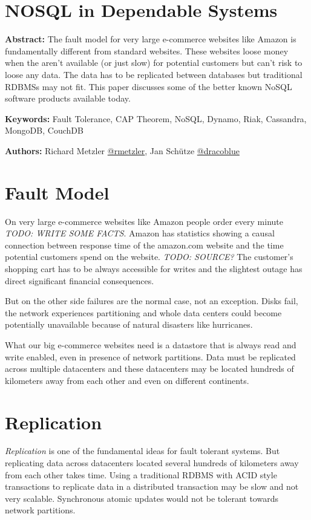 \section{NOSQL in Dependable Systems}

\textbf{Abstract:} The fault model for very large e-commerce
websites like Amazon is fundamentally different from standard
websites. These websites loose money when the aren't available (or
just slow) for potential customers but can't risk to loose any
data. The data has to be replicated between databases but
traditional RDBMSs may not fit. This paper discusses some of the
better known NoSQL software products available today.

\textbf{Keywords:} Fault Tolerance, CAP Theorem, NoSQL, Dynamo,
Riak, Cassandra, MongoDB, CouchDB

\textbf{Authors:} Richard Metzler
\href{twitter.com/rmetzler}{@rmetzler}, Jan Schütze
\href{twitter.com/dracoblue}{@dracoblue}

\section{Fault Model}

On very large e-commerce websites like Amazon people order every
minute \emph{TODO: WRITE SOME FACTS}. Amazon has statistics showing
a causal connection between response time of the amazon.com website
and the time potential customers spend on the website.
\emph{TODO: SOURCE?} The customer's shopping cart has to be always
accessible for writes and the slightest outage has direct
significant financial consequences.

But on the other side failures are the normal case, not an
exception. Disks fail, the network experiences partitioning and
whole data centers could become potentially unavailable because of
natural disasters like hurricanes.

What our big e-commerce websites need is a datastore that is always
read and write enabled, even in presence of network partitions.
Data must be replicated across multiple datacenters and these
datacenters may be located hundreds of kilometers away from each
other and even on different continents.

\section{Replication}

\emph{Replication} is one of the fundamental ideas for fault
tolerant systems. But replicating data across datacenters located
several hundreds of kilometers away from each other takes time.
Using a traditional RDBMS with ACID style transactions to replicate
data in a distributed transaction may be slow and not very
scalable. Synchronous atomic updates would not be tolerant towards
network partitions.

